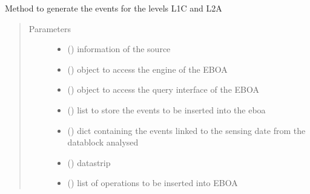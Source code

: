 \begin{fulllineitems}
\label{\detokenize{s2boa.ingestions:s2boa.ingestions.functions.L1C_L2A_processing}}
Method to generate the events for the levels L1C and L2A
\begin{quote}\begin{description}
\item[{Parameters}] \leavevmode\begin{itemize}
\item {} 
 () \textendash{} information of the source

\item {} 
 () \textendash{} object to access the engine of the EBOA

\item {} 
 () \textendash{} object to access the query interface of the EBOA

\item {} 
 () \textendash{} list to store the events to be inserted into the eboa

\item {} 
 () \textendash{} dict containing the events linked to the sensing date from the datablock analysed

\item {} 
 () \textendash{} datastrip

\item {} 
 () \textendash{} list of operations to be inserted into EBOA


\end{itemize}
\end{description}
\end{quote}
\end{fulllineitems}
